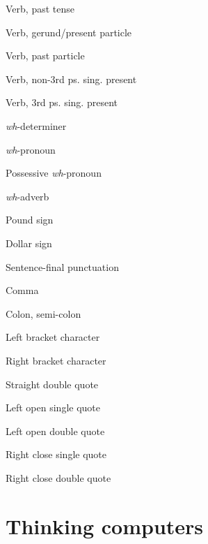 \begin{multicols}{2}
\begin{description}[leftmargin=1.5cm]
  \item[VBD  ] Verb, past tense                      
  \item[VBG  ] Verb, gerund/present particle         
  \item[VBN  ] Verb, past particle                   
  \item[VBP  ] Verb, non-3rd ps. sing. present       
  \item[VBZ  ] Verb, 3rd ps. sing. present           
  \item[WDT  ] \textit{wh}-determiner                
  \item[WP   ] \textit{wh}-pronoun                   
  \item[WP\$ ] Possessive \textit{wh}-pronoun        
  \item[WRB  ] \textit{wh}-adverb                    
  \item[\#   ] Pound sign                            
  \item[\$   ] Dollar sign                           
  \item[.    ] Sentence-final punctuation            
  \item[,    ] Comma                                 
  \item[:    ] Colon, semi-colon                     
  \item[(    ] Left bracket character                
  \item[)    ] Right bracket character               
  \item["    ] Straight double quote                 
  \item[`   ] Left open single quote               
  \item[`` ] Left open double quote              
  \item['   ] Right close single quote             
  \item['' ] Right close double quote      
\end{description}      
\end{multicols}


\section{Thinking computers}
\label{s:think}

